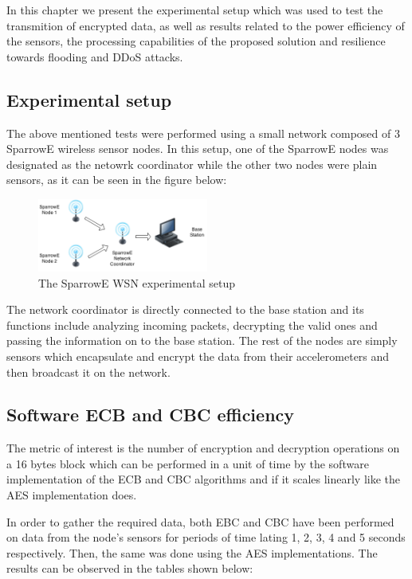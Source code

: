 In this chapter we present the experimental setup which was 
used to test the transmition of encrypted data, as well as results 
related to the power efficiency of the sensors, the processing 
capabilities of the proposed solution and resilience towards 
flooding and DDoS attacks.

\subsection{Experimental setup}

The above mentioned tests were performed using a small network 
composed of 3 SparrowE wireless sensor nodes. In this setup, 
one of the SparrowE nodes was designated as the netowrk coordinator 
while the other two nodes were plain sensors, as it can be seen in 
the figure below:

\begin{figure}[ht] \centering
  \includegraphics[width=0.5\textwidth]{img/experimental-setup.png}
  \caption{The SparrowE WSN experimental setup}
\end{figure}

The network coordinator is directly connected to the base station and 
its functions include analyzing incoming packets, decrypting the valid 
ones and passing the information on to the base station. The rest of the 
nodes are simply sensors which encapsulate and encrypt the data from their 
accelerometers and then broadcast it on the network.

\subsection{Software ECB and CBC efficiency}

The metric of interest is the number of encryption and decryption operations 
on a 16 bytes block which can be performed in a unit of time by the software 
implementation of the ECB and CBC algorithms and if it scales linearly like 
the AES implementation does.

In order to gather the required data, both EBC and CBC have been performed on 
data from the node's sensors for periods of time lating 1, 2, 3, 4 and 5 seconds 
respectively. Then, the same was done using the AES implementations. The results 
can be observed in the tables shown below:

